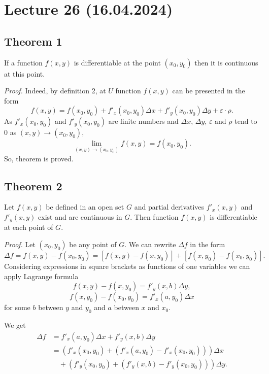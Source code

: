 \documentclass{article}
\begin{document}
\section*{Lecture 26 (16.04.2024)}

\subsection*{Theorem 1}

\begin{theorem}
If a function $f(x, y)$ is differentiable at the point $(x_0, y_0)$ then it is continuous at this point.
\end{theorem}

\vspace{1em}

\textit{Proof.} Indeed, by definition 2, at $U$ function $f(x, y)$ can be presented in the form
\[
f(x, y) = f(x_0, y_0) + f'_x (x_0, y_0)\Delta x + f'_y (x_0, y_0)\Delta y + \varepsilon \cdot \rho.
\]
As $f'_x (x_0, y_0)$ and $f'_y (x_0, y_0)$ are finite numbers and $\Delta x$, $\Delta y$, $\varepsilon$ and $\rho$ tend to 0 as $(x, y) \to (x_0, y_0)$,
\[
\lim_{(x, y) \to (x_0, y_0)} f(x, y) = f(x_0, y_0).
\]
So, theorem is proved.

\subsection*{Theorem 2}

\begin{theorem}
Let $f(x, y)$ be defined in an open set $G$ and partial derivatives $f'_x(x, y)$ and $f'_y(x, y)$ exist and are continuous in $G$. Then function $f(x, y)$ is differentiable at each point of $G$.
\end{theorem}

\vspace{1em}

\textit{Proof.} Let $(x_0, y_0)$ be any point of $G$. We can rewrite $\Delta f$ in the form
\[
\Delta f = f(x, y) - f(x_0, y_0) = [f(x, y) - f(x, y_0)] + [f(x, y_0) - f(x_0, y_0)].
\]
Considering expressions in square brackets as functions of one variables we can apply Lagrange formula
\[
f(x, y) - f(x, y_0) = f'_y(x, b)\Delta y,
\]
\[
f(x, y_0) - f(x_0, y_0) = f'_x(a, y_0)\Delta x
\]
for some $b$ between $y$ and $y_0$ and $a$ between $x$ and $x_0$.

We get
\begin{align*}
\Delta f &= f'_x (a, y_0)\Delta x + f'_y (x, b)\Delta y \\
&= \left(f'_x (x_0, y_0) + (f'_x (a, y_0) - f'_x (x_0, y_0))\right)\Delta x \\
&\quad + \left(f'_y (x_0, y_0) + (f'_y (x, b) - f'_y (x_0, y_0))\right)\Delta y.
\end{align*}
\end{document}
